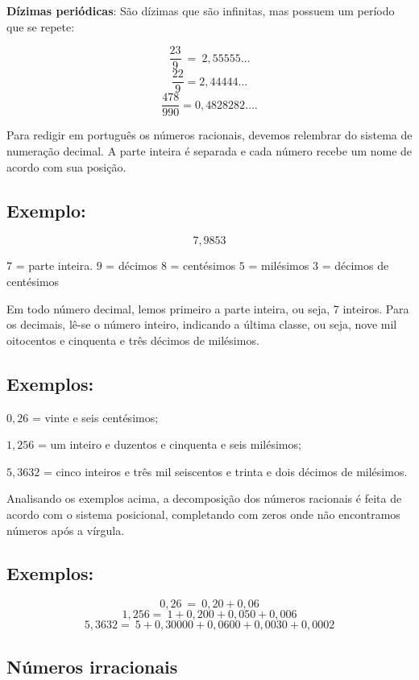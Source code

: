 \textbf{Dízimas periódicas}: São dízimas que são infinitas, mas possuem um
período que se repete: 

$$\frac{23}{9}\  = \ 2,55555\ldots{}$$
$$\frac{22}{9} = 2,44444\ldots{}$$
$$\frac{478}{990} = 0,4828282\ldots{}.$$

Para redigir em português os números racionais, devemos relembrar do
sistema de numeração decimal. A parte inteira é separada e cada número
recebe um nome de acordo com sua posição.

\subsection{Exemplo:} 


$$7,9853$$

$7$ = parte inteira. $9$ = décimos $8$ = centésimos $5$ = milésimos $3$ = décimos
de centésimos

Em todo número decimal, lemos primeiro a parte inteira, ou seja, 7
inteiros. Para os decimais, lê-se o número inteiro, indicando a última
classe, ou seja, nove mil oitocentos e cinquenta e três décimos de
milésimos.

\subsection{Exemplos:}

$0,26$ = vinte e seis centésimos;

$1,256$ = um inteiro e duzentos e cinquenta e seis milésimos;

$5,3632$ = cinco inteiros e três mil seiscentos e trinta e dois décimos de
milésimos.

Analisando os exemplos acima, a decomposição dos números racionais é feita de 
acordo com o sistema posicional, completando com zeros onde não encontramos 
números após a vírgula.

\subsection{Exemplos:}

$$0,26\  = \ 0,20 + 0,06$$
$$1,256 = \ 1 + 0,200 + 0,050 + 0,006$$
$$5,3632 = \ 5 + 0,30000 + 0,0600 + 0,0030 + 0,0002$$

\subsection{Números irracionais}

